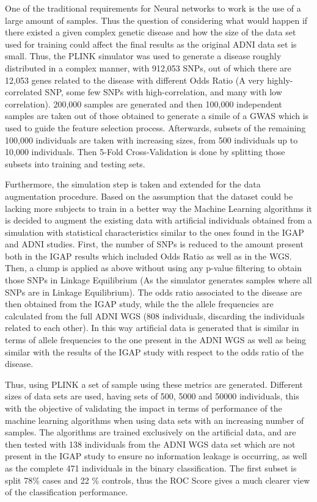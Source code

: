 One of the traditional requirements for Neural networks to work is the use of a large amount of samples. Thus the question of considering what would happen if there existed a given complex genetic disease and how the size of the data set used for training could affect the final results as the original ADNI data set is small. Thus, the PLINK simulator was used to generate a disease roughly distributed in a complex manner, with 912,053 SNPs, out of which there are 12,053 genes related to the disease with different Odds Ratio (A very highly-correlated SNP, some few SNPs with high-correlation, and many with low correlation). 200,000 samples are generated and then 100,000 independent samples are taken out of those obtained to generate a simile of a GWAS which is used to guide the feature selection process. Afterwards,  subsets of the remaining 100,000 individuals are taken with increasing sizes, from 500 individuals up to 10,000 individuals. Then 5-Fold Cross-Validation is done by splitting those subsets into training and testing sets.

Furthermore, the simulation step is taken and extended for the data augmentation procedure. Based on the assumption that the dataset could be lacking more subjects to train in a better way the Machine Learning algorithms it is decided to augment the existing data with artificial individuals obtained from a simulation with statistical characteristics similar to the ones found in the IGAP and ADNI studies. First, the number of SNPs is reduced to the amount present both in the IGAP results which included Odds Ratio as well as in the WGS. Then, a clump is applied as above without using any p-value filtering to obtain those SNPs in Linkage Equilibrium (As the simulator generates samples where all SNPs are in Linkage Equilibrium). The odds ratio associated to the disease are then obtained from the IGAP study, while the the allele frequencies are calculated from the full ADNI WGS (808 individuals, discarding the individuals related to each other). In this way artificial data is generated that is similar in terms of allele frequencies to the one present in the ADNI WGS as well as being similar with the results of the IGAP study with respect to the odds ratio of the disease.

Thus, using PLINK a set of sample using these metrics are generated. Different sizes of data sets are used, having sets of 500, 5000 and 50000 individuals, this with the objective of validating the impact in terms of performance of the machine learning algorithms when using data sets with an increasing number of samples. The algorithms are trained exclusively on the artificial data, and are then tested with 138 individuals from the ADNI WGS data set which are not present in the IGAP study to ensure no information leakage is occurring, as well as the complete 471 individuals in the binary classification. The first subset is split 78\% cases and 22 \% controls, thus the ROC Score gives a much clearer view of the classification performance.

